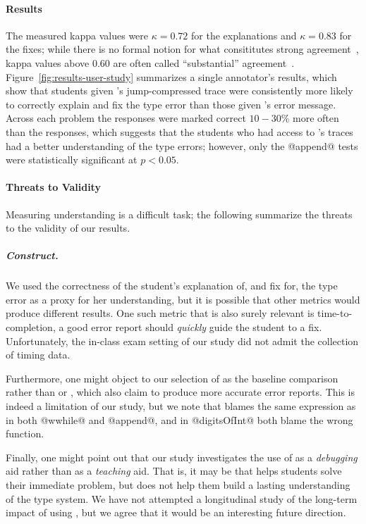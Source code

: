 \paragraph{Results}
%
The measured kappa values were $\kappa = 0.72$ for the explanations and
$\kappa = 0.83$ for the fixes; while there is no formal notion for what
consititutes strong agreement~\cite{Krippendorff2012-wd}, kappa values
above $0.60$ are often called ``substantial''
agreement~\cite{Landis1977-ey}.
%
Figure~\ref{fig:results-user-study} summarizes a single annotator's
results, which show that students given \toolname's jump-compressed
trace were consistently more likely to correctly explain
and fix the type error than those given \ocaml's error message.
%
Across each problem the \toolname responses were marked correct
$10-30\%$ more often than the \ocaml responses, which suggests that
the students who had access to \toolname's traces had a better
understanding of the type errors;
%
however, only the @append@ tests were statistically significant at
$p < 0.05$.
%

\paragraph{Threats to Validity}
Measuring understanding is a difficult task; the following summarize
the threats to the validity of our results.

\subparagraph{Construct.}
%
We used the correctness of the student's explanation of, and fix for,
the type error as a proxy for her understanding, but it is possible that
other metrics would produce different results. One such metric that is
also surely relevant is time-to-completion, \ie a good error report
should \emph{quickly} guide the student to a fix. Unfortunately, the
in-class exam setting of our study did not admit the collection of
timing data.

Furthermore, one might object to our selection of \ocaml as
the baseline comparison rather than \sherrloc or \mycroft, which also
claim to produce more accurate error reports. This is indeed a
limitation of our study, but we note that \sherrloc blames the same
expression as \ocaml in both @wwhile@ and @append@, and in @digitsOfInt@
both blame the wrong function.

Finally, one might point out that our study investigates the use of
\toolname as a \emph{debugging} aid rather than as a \emph{teaching}
aid. That is, it may be that \toolname helps students solve their
immediate problem, but does not help them build a lasting understanding
of the type system. We have not attempted a longitudinal study of the
long-term impact of using \toolname, but we agree that it would be an
interesting future direction.

